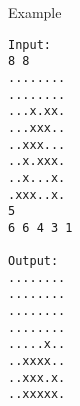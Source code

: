 Example
\begin{verbatim}
Input:
8 8
........
........
...x.xx.
...xxx..
..xxx...
..x.xxx.
..x...x.
.xxx..x.
5
6 6 4 3 1

Output:
........
........
........
........
.....x..
..xxxx..
..xxx.x.
..xxxxx.
\end{verbatim}